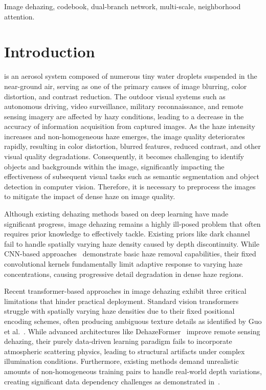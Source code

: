 \documentclass[journal]{IEEEtran}
\begin{document}
\begin{IEEEkeywords}
	Image dehazing, codebook, dual-branch network, multi-scale, neighborhood attention.
\end{IEEEkeywords}


\section{Introduction}
 is an aerosol system composed of numerous tiny water droplets suspended in the near-ground air, serving as one of the primary causes of image blurring, color distortion, and contrast reduction. The outdoor visual systems such as autonomous driving, video surveillance, military reconnaissance, and remote sensing imagery are affected by hazy conditions, leading to a decrease in the accuracy of information acquisition from captured images. As the haze intensity increases and non-homogeneous haze emerges, the image quality deteriorates rapidly, resulting in color distortion, blurred features, reduced contrast, and other visual quality degradations. Consequently, it becomes challenging to identify objects and backgrounds within the image, significantly impacting the effectiveness of subsequent visual tasks such as semantic segmentation and object detection in computer vision. Therefore, it is necessary to preprocess the images to mitigate the impact of dense haze on image quality.

Although existing dehazing methods based on deep learning have made significant progress, image dehazing remains a highly ill-posed problem that often requires prior knowledge to effectively tackle. Existing priors like dark channel~\cite{he2010single} fail to handle spatially varying haze density caused by depth discontinuity. While CNN-based approaches~\cite{cai2016dehazenet, li2017aod, yu2021two} demonstrate basic haze removal capabilities, their fixed convolutional kernels fundamentally limit adaptive response to varying haze concentrations, causing progressive detail degradation in dense haze regions.

Recent transformer-based approaches in image dehazing exhibit three critical limitations that hinder practical deployment. Standard vision transformers struggle with spatially varying haze densities due to their fixed positional encoding schemes, often producing ambiguous texture details as identified by Guo et al.~\cite{guo2022image}. While advanced architectures like DehazeFormer~\cite{song2023vision} improve remote sensing dehazing, their purely data-driven learning paradigm fails to incorporate atmospheric scattering physics, leading to structural artifacts under complex illumination conditions. Furthermore, existing methods demand unrealistic amounts of non-homogeneous training pairs to handle real-world depth variations, creating significant data dependency challenges as demonstrated in~\cite{liu2023data}.
\end{document}
